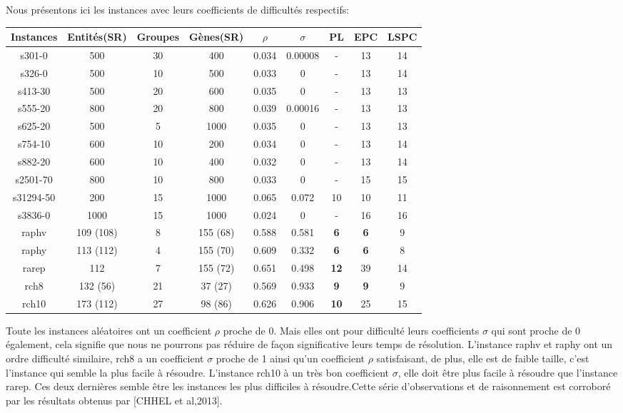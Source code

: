 \documentclass[a4paper,10pt]{article}
\begin{document}
Nous présentons ici les instances avec leurs coefficients de difficultés respectifs:
\begin{center}
\begin{tabular}{|c|c|c|c|c|c|c|c|c|}
\hline 
Instances & Entités(SR) & Groupes & Gènes(SR)& $\rho$ & $\sigma$ & PL & EPC & LSPC \\ 
\hline 
s301-0 & 500 & 30 & 400 & 0.034 & 0.00008 & - & 13 & 14 \\ 
\hline 
s326-0 & 500 & 10 & 500 & 0.033 & 0 & - & 13 & 14 \\ 
\hline 
s413-30 & 500 & 20 & 600 & 0.035 & 0 & - & 13 & 13 \\ 
\hline 
s555-20 & 800 & 20 & 800 & 0.039 & 0.00016 & - & 13 & 13 \\ 
\hline 
s625-20 & 500 & 5 & 1000 & 0.035 & 0 & - & 13 & 13 \\ 
\hline 
s754-10 & 600 & 10 & 200 & 0.034 & 0 & - & 13 & 14 \\ 
\hline 
s882-20 & 600 & 10 & 400 & 0.032 & 0 & - & 13 & 14 \\ 
\hline 
s2501-70 & 800 & 10 & 800 & 0.033 & 0 & - & 15 & 15 \\ 
\hline 
s31294-50 & 200 & 15 & 1000 & 0.065 & 0.072 & 10 & 10 & 11 \\ 
\hline 
s3836-0 & 1000 & 15 & 1000 & 0.024 & 0 & - & 16 & 16 \\ 
\hline 
raphv & 109 (108) & 8 & 155 (68) & 0.588 & 0.581 & \textbf{6} & \textbf{6} & 9 \\ 
\hline 
raphy & 113 (112) & 4 & 155 (70) & 0.609 & 0.332 & \textbf{6} & \textbf{6} & 8 \\ 
\hline 
rarep & 112 & 7 & 155 (72) & 0.651 & 0.498 & \textbf{12} & 39 & 14 \\ 
\hline 
rch8 & 132 (56) & 21 & 37 (27) & 0.569 & 0.933 & \textbf{9} & \textbf{9} & 9 \\ 
\hline 
rch10 & 173 (112) & 27 & 98 (86) & 0.626 & 0.906 & \textbf{10} & 25 & 15 \\ 
\hline 
\end{tabular} 
\end{center}

Toute les instances aléatoires ont un coefficient $\rho$ proche de 0. Mais elles ont pour difficulté leurs coefficients $\sigma$ qui sont proche de 0 également, cela signifie que nous ne pourrons pas réduire de façon significative leurs temps de résolution. L'instance raphv et raphy ont un ordre difficulté similaire, rch8 a un coefficient $\sigma$ proche de 1 ainsi qu'un coefficient $\rho$ satisfaisant, de plus, elle est de faible taille, c'est l'instance qui semble la plus facile à résoudre. L'instance rch10 à un très bon coefficient $\sigma$, elle doit être plus facile à résoudre que l'instance rarep. Ces deux dernières semble être les instances les plus difficiles à résoudre.Cette série d'observations et de raisonnement est corroboré par les résultats obtenus par [CHHEL et al,2013].
\end{document}
